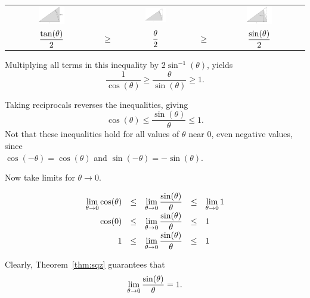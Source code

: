 \begin{example}
\begin{center}
\begin{tabular}{ccccc}
\includegraphics[width=0.3\textwidth]{fig_lim_10a} & & \includegraphics[width=0.3\textwidth]{fig_lim_10b}  & & \includegraphics[width=0.3\textwidth]{fig_lim_10c} \\
$\displaystyle \frac{\tan (\theta)}{2}$\rule{0pt}{25pt} & $\geq$ & $\displaystyle \frac{ \theta}{2}$ & $\geq$ & $\displaystyle \frac{\sin  (\theta)}{2}$
\end{tabular}
\end{center}


Multiplying all terms in this inequality by $2\sin^{-1} (\theta)$, yields
 $$\frac{1}{\cos(\theta)} \geq \frac{\theta}{\sin (\theta)} \geq 1.$$

Taking reciprocals reverses the inequalities, giving $$ \cos (\theta) \leq \frac{\sin (\theta)}{\theta} \leq 1.$$ Not that these inequalities hold for all values of $\theta$ near 0, even negative values, since \\ $\cos (-\theta) = \cos (\theta)$ and $\sin (-\theta) = -\sin (\theta)$.

Now take limits for $\theta\to 0$.

$$
\begin{array}{rcccl}
\displaystyle\lim_{\theta\to 0} \cos (\theta) &\leq&\displaystyle \lim_{\theta\to 0} \dfrac{\sin(\theta)}{\theta} &\leq&\displaystyle \lim_{\theta\to 0}  1 \\[0.2cm]
\cos (0) &\leq& \displaystyle\lim_{\theta\to 0} \dfrac{\sin(\theta)}{\theta} &\leq&  1 \\[0.2cm]
1&\leq&\displaystyle \lim_{\theta\to 0} \dfrac{\sin(\theta)}{\theta} &\leq&  1
\end{array}
$$

Clearly, Theorem~\ref{thm:sqz} guarantees that 
$$\displaystyle \lim_{\theta\to 0} \frac{\sin(\theta)}{\theta}=1.$$

\end{example}

